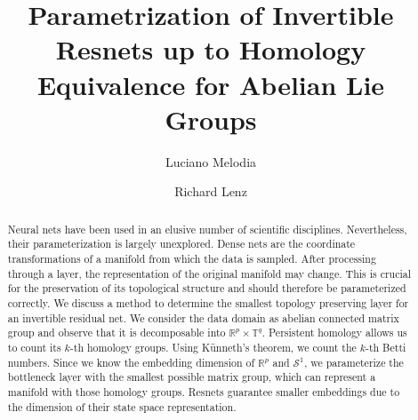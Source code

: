 \documentclass[envcountsect,runningheads]{llncs}
\begin{document}
%
\title{Parametrization of Invertible Resnets up to Homology Equivalence for Abelian Lie Groups}
%
%
\author{Luciano Melodia \\
\and Richard Lenz}
%
%
%
\maketitle              %
%
\begin{abstract}
Neural nets have been used in an elusive number of scientific disciplines. Nevertheless, their parameterization is largely unexplored. Dense nets are the coordinate transformations of a manifold from which the data is sampled. After processing through a layer, the representation of the original manifold may change. This is crucial for the preservation of its topological structure and should therefore be parameterized correctly. We discuss a method to determine the smallest topology preserving layer for an invertible residual net. We consider the data domain as abelian connected matrix group and observe that it is decomposable into $\mathbb{R}^p \times \mathbb {T}^q$. Persistent homology allows us to count its $k$-th homology groups. Using Künneth's theorem, we count the $k$-th Betti numbers. Since we know the embedding dimension of $\mathbb{R}^p$ and $\mathcal{S}^1$, we parameterize the bottleneck layer with the smallest possible matrix group, which can represent a manifold with those homology groups. Resnets guarantee smaller embeddings due to the dimension of their state space representation.

\end{abstract}
\end{document}
